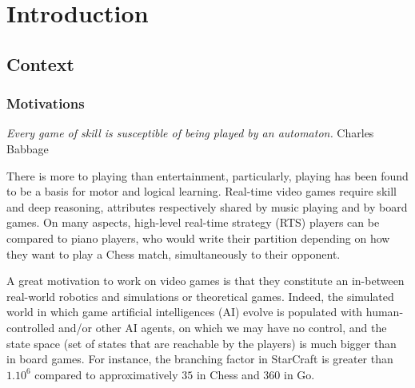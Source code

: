 \chapter{Introduction}


\section{Context}
\subsection{Motivations}
\textit{Every game of skill is susceptible of being played by an automaton.} Charles Babbage



There is more to playing than entertainment, particularly, playing has been found to be a basis for motor and logical learning. Real-time video games require skill and deep reasoning, attributes respectively shared by music playing and by board games. On many aspects, high-level real-time strategy (RTS) players can be compared to piano players, who would write their partition depending on how they want to play a Chess match, simultaneously to their opponent. 


A great motivation to work on video games is that they constitute an in-between real-world robotics and simulations or theoretical games. Indeed, the simulated world in which game artificial intelligences (AI) evolve is populated with human-controlled and/or other AI agents, on which we may have no control, and the state space (set of states that are reachable by the players) is much bigger than in board games. For instance, the branching factor in StarCraft is greater than $1.10^6$ compared to approximatively $35$ in Chess and $360$ in Go.


